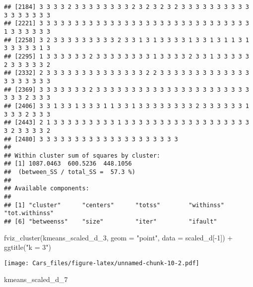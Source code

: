 \documentclass[
]{article}
\newenvironment{Shaded}{\begin{snugshade}}{\end{snugshade}}
\newcommand{\AttributeTok}[1]{\textcolor[rgb]{0.77,0.63,0.00}{#1}}
\newcommand{\DecValTok}[1]{\textcolor[rgb]{0.00,0.00,0.81}{#1}}
\newcommand{\FunctionTok}[1]{\textcolor[rgb]{0.00,0.00,0.00}{#1}}
\newcommand{\NormalTok}[1]{#1}
\newcommand{\SpecialCharTok}[1]{\textcolor[rgb]{0.00,0.00,0.00}{#1}}
\newcommand{\StringTok}[1]{\textcolor[rgb]{0.31,0.60,0.02}{#1}}
\begin{document}
\begin{verbatim}
## [2184] 3 3 3 3 2 3 3 3 3 3 3 3 3 2 3 2 3 2 3 2 3 3 3 3 3 3 3 3 3 3 3 3 3 3 3 3 3
## [2221] 3 3 3 3 3 3 3 3 3 3 3 3 3 3 3 3 3 3 3 3 3 3 3 3 3 3 3 3 3 3 1 3 3 3 3 3 3
## [2258] 3 2 3 3 3 3 3 3 3 3 3 2 3 3 1 3 1 3 3 3 3 1 3 3 1 3 1 1 3 1 3 3 3 3 3 1 3
## [2295] 1 3 3 3 3 3 3 2 3 3 3 3 3 3 3 3 1 3 3 3 3 2 3 3 1 3 3 3 3 3 2 3 3 3 3 3 2
## [2332] 2 3 3 3 3 3 3 3 3 3 3 3 3 3 3 2 2 3 3 3 3 3 3 3 3 3 3 3 3 3 3 3 3 3 3 3 3
## [2369] 3 3 3 3 3 3 3 2 3 3 3 3 3 3 3 3 3 3 3 3 3 3 3 3 3 3 3 3 3 3 3 3 3 2 3 3 3
## [2406] 3 3 1 3 3 1 3 3 3 1 1 3 3 1 3 3 3 3 3 3 3 3 2 3 3 3 3 3 3 1 3 3 3 2 3 3 3
## [2443] 2 1 3 3 3 3 3 3 3 3 3 1 3 3 3 3 3 3 3 3 3 3 3 3 3 3 3 3 3 3 3 2 3 3 3 3 2
## [2480] 3 3 3 3 3 3 3 3 3 3 3 3 3 3 3 3 3 3 3 3
## 
## Within cluster sum of squares by cluster:
## [1] 1087.0463  600.5236  448.1056
##  (between_SS / total_SS =  57.3 %)
## 
## Available components:
## 
## [1] "cluster"      "centers"      "totss"        "withinss"     "tot.withinss"
## [6] "betweenss"    "size"         "iter"         "ifault"
\end{verbatim}

\begin{Shaded}
\begin{Highlighting}[]
\FunctionTok{fviz\_cluster}\NormalTok{(kmeans\_scaled\_d\_3, }\AttributeTok{geom =} \StringTok{"point"}\NormalTok{, }\AttributeTok{data =}\NormalTok{ scaled\_d[}\SpecialCharTok{{-}}\DecValTok{1}\NormalTok{]) }\SpecialCharTok{+} \FunctionTok{ggtitle}\NormalTok{(}\StringTok{"k = 3"}\NormalTok{)}
\end{Highlighting}
\end{Shaded}

\texttt{[image: Cars\_files/figure-latex/unnamed-chunk-10-2.pdf]}

\begin{Shaded}
\begin{Highlighting}[]
\NormalTok{kmeans\_scaled\_d\_7}
\end{Highlighting}
\end{Shaded}
\end{document}
